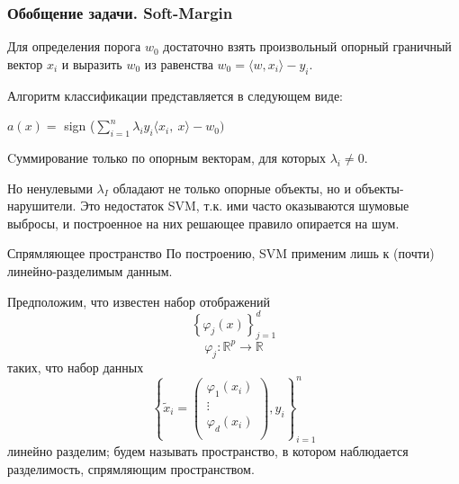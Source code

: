 \documentclass[11pt]{beamer}
\begin{document}
\begin{frame}
	\frametitle{Обобщение задачи. Soft-Margin}
	Для определения порога $w_0$ достаточно взять произвольный опорный граничный вектор $x_i$ и выразить $w_0$ из равенства $w_{0}=\langle w, x_{i}\rangle-y_{i}$.
	
	Алгоритм классификации представляется в следующем виде:
	
	\begin{center}
		$a(x)=$ sign ($\displaystyle \sum_{i=1}^{n}\lambda_{i}y_{i}\langle x_{i},\ x\rangle-w_{0})$
	\end{center} 
	
	Cуммирование только по опорным векторам, для которых $\lambda_i \neq 0$. 
		
	Но ненулевыми $\lambda_I$ обладают не только опорные объекты, но и объекты-нарушители. Это недостаток SVM, т.к. ими часто оказываются шумовые выбросы, и построенное на них решающее правило опирается на шум. 
\end{frame}

\begin{frame}{Спрямляющее пространство}
	По построению, SVM применим лишь к (почти) линейно-разделимым данным.
	
	Предположим, что известен набор отображений 
	$$\left\{\varphi_j\left(x\right)\right\}_{j=1}^{d}$$
	$$\varphi_j:\mathbb{R}^p\rightarrow \mathbb{R}$$
	таких, что набор данных 
	$$\left\{\tilde{x}_i=\begin{pmatrix}
		\varphi_1\left(x_i\right) \\
		\vdots \\
		\varphi_d\left(x_i\right) \\
	\end{pmatrix}, y_i\right\}_{i=1}^{n}$$
	линейно разделим; будем называть пространство, в котором наблюдается
	разделимость, спрямляющим пространством.
	
\end{frame}
\end{document}
